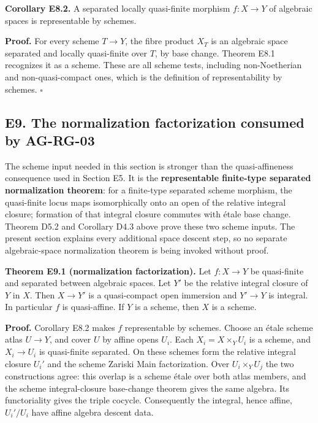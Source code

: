 \documentclass[11pt,a4paper,openany]{report}
\begin{document}
\textbf{Corollary E8.2.} A separated locally quasi-finite morphism \(f:X\to Y\) of algebraic spaces is representable by schemes.

\textbf{Proof.} For every scheme \(T\to Y\), the fibre product \(X_T\) is an algebraic space separated and locally quasi-finite over \(T\), by base change. Theorem E8.1 recognizes it as a scheme. These are all scheme tests, including non-Noetherian and non-quasi-compact ones, which is the definition of representability by schemes. \(\square\)

\subsection{E9. The normalization factorization consumed by AG-RG-03}\label{AG-RG-S04-e9.-the-normalization-factorization-consumed-by-ag-rg-03}

The scheme input needed in this section is stronger than the quasi-affineness consequence used in Section E5. It is the \textbf{representable finite-type separated normalization theorem}: for a finite-type separated scheme morphism, the quasi-finite locus maps isomorphically onto an open of the relative integral closure; formation of that integral closure commutes with étale base change. Theorem D5.2 and Corollary D4.3 above prove these two scheme inputs. The present section explains every additional space descent step, so no separate algebraic-space normalization theorem is being invoked without proof.

\textbf{Theorem E9.1 (normalization factorization).} Let \(f:X\to Y\) be quasi-finite and separated between algebraic spaces. Let \(Y'\) be the relative integral closure of \(Y\) in \(X\). Then \(X\to Y'\) is a quasi-compact open immersion and \(Y'\to Y\) is integral. In particular \(f\) is quasi-affine. If \(Y\) is a scheme, then \(X\) is a scheme.

\textbf{Proof.} Corollary E8.2 makes \(f\) representable by schemes. Choose an étale scheme atlas \(U\to Y\), and cover \(U\) by affine opens \(U_i\). Each \(X_i=X\times_Y U_i\) is a scheme, and \(X_i\to U_i\) is quasi-finite separated. On these schemes form the relative integral closure \(U_i'\) and the scheme Zariski Main factorization. Over \(U_i\times_Y U_j\) the two constructions agree: this overlap is a scheme étale over both atlas members, and the scheme integral-closure base-change theorem gives the same algebra. Its functoriality gives the triple cocycle. Consequently the integral, hence affine, \(U_i'/U_i\) have affine algebra descent data.
\end{document}
